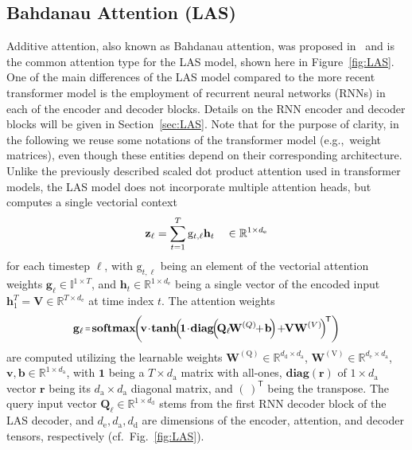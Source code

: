 \documentclass{article}
\newcommand{\VEC}[1]{\mathbf{#1}}          \newcommand{\VECG}[1]{\boldmath{#1}}     \newcommand{\MAT}[1]{\mathbf{#1}}          \newcommand{\MATG}[1]{\boldsymbol{#1}}
\newcommand\shorteq{\rule[.35ex]{4pt}{0.4pt}\llap{\rule[.75ex]{4pt}{0.4pt}}}
\begin{document}
\subsection{Bahdanau Attention (LAS)}\vspace{-2mm}
Additive attention, also known as Bahdanau attention, was proposed in~\cite{Bahdanau2015} and is the common attention type for the LAS model, shown here in Figure~\ref{fig:LAS}. One of the main differences of the LAS model compared to the more recent transformer model is the employment of recurrent neural networks (RNNs) in each of the encoder and decoder blocks. Details on the RNN encoder and decoder blocks will be given in Section~\ref{sec:LAS}. Note that for the purpose of clarity, in the following we reuse some notations of the transformer model (e.g.,\ weight matrices), even though these entities depend on their corresponding architecture. Unlike the previously described scaled dot product attention used in transformer models, the LAS model does not incorporate multiple attention heads, but computes a single vectorial context   
\vspace{-1mm}
\begin{equation}\label{eq:bahdanauScore}\vspace{-2mm}
\VEC{z}_\ell=\sum\limits_{t=1}^{T}\mathrm{g}_{t,\ell}\MAT{h}_t \quad\in \mathbb{R}^{1\times d_\mathrm{e} }
\end{equation}
for each timestep $\ell$, with $\mathrm{g}_{t,\ell}$ being an element of the vectorial attention weights $\VEC{g}_\ell\!\in\!\mathbb{I}^{1\times T}$,  and $\MAT{h}_t\in\!\mathbb{R}^{1\times d_\mathrm{e} }$ being a single vector of the encoded input  $\MAT{h}_1^T\!=\!\MAT{V}\!\in\!\mathbb{R}^{T\times d_\mathrm{e} }$ at time index $t$. The attention weights
\vspace{-1mm}
\begin{equation}\label{eq:bahdanauAtt}\vspace{1mm}
\VEC{g}_\ell\,\shorteq\,\mathbf{softmax}\!\!\left(\!\mathbf{v}\!\cdot\!\mathbf{tanh}\!\!\left(\!\VEC{1}\!\cdot\!\mathbf{diag }\!\!\left(\!\VEC{Q}_\ell\!\MAT{W}^{({Q})}\!\!+\!\VEC{b} \!\right)\! +\!\! \VEC{V}\MAT{W}^{({V})}\!\right)^{\!\mathsf{T}} \right)
\end{equation}
are computed utilizing the learnable weights $\MAT{W}^\mathrm{(Q)}\!\in\!\mathbb{R}^{d_\mathrm{d}\!\times\! d_\mathrm{a}}$, $\MAT{W}^\mathrm{(V)}\!\in\!\mathbb{R}^{d_\mathrm{e}\!\times\! d_\mathrm{a}}$, $\MAT{v},\MAT{b}\!\in\!\mathbb{R}^{1\times d_\mathrm{a}}$, with $\VEC{1}$ being a $T\!\times\!d_\mathrm{a}$ matrix with all-ones, $\mathbf{diag}(\MAT{r})$ of $1\!\times\!d_\mathrm{a}$ vector $\MAT{r}$ being its $d_\mathrm{a}\!\times\!d_\mathrm{a}$ diagonal matrix, and $(\,)^\mathsf{T}$ being the transpose. The query input vector $\MAT{Q}_\ell\!\in\!\mathbb{R}^{1\times d_\mathrm{d}}$ stems from the first RNN decoder block of the LAS decoder, and $d_\mathrm{e},d_\mathrm{a},d_\mathrm{d}$ are dimensions of the encoder, attention, and decoder tensors, respectively (cf.\ Fig.~\ref{fig:LAS}).
\end{document}
